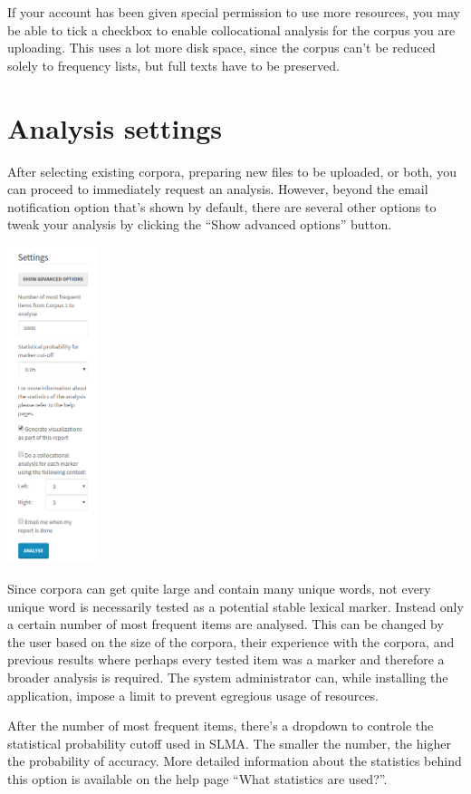 \documentclass[11pt,a4paper]{article}
\begin{document}
If your account has been given special permission to use more resources, you may be able to tick a checkbox to enable collocational analysis for the corpus you are uploading. This uses a lot more disk space, since the corpus can't be reduced solely to frequency lists, but full texts have to be preserved.

\section{Analysis settings}

After selecting existing corpora, preparing new files to be uploaded, or both, you can proceed to immediately request an analysis. However, beyond the email notification option that's shown by default, there are several other options to tweak your analysis by clicking the ``Show advanced options'' button.

\centerline{\includegraphics[width=0.2\textwidth]{images/advancedsettings.png}}

Since corpora can get quite large and contain many unique words, not every unique word is necessarily tested as a potential stable lexical marker. Instead only a certain number of most frequent items are analysed. This can be changed by the user based on the size of the corpora, their experience with the corpora, and previous results where perhaps every tested item was a marker and therefore a broader analysis is required. The system administrator can, while installing the application, impose a limit to prevent egregious usage of resources. 

After the number of most frequent items, there's a dropdown to controle the statistical probability cutoff used in SLMA. The smaller the number, the higher the probability of accuracy. More detailed information about the statistics behind this option is available on the help page ``What statistics are used?''.
\end{document}
